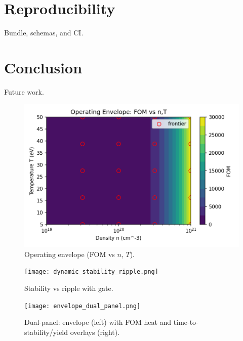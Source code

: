 \documentclass[11pt]{article}
\begin{document}
\section{Reproducibility}
Bundle, schemas, and CI.
\section{Conclusion}
Future work.
\begin{figure}[h]
\centering
\includegraphics[width=0.7\linewidth]{operating_envelope.png}
\caption{Operating envelope (FOM vs $n$, $T$).}\label{fig:envelope}
\end{figure}
\begin{figure}[h]
\centering
\texttt{[image: dynamic\_stability\_ripple.png]}
\caption{Stability vs ripple with gate.}\label{fig:ripple}
\end{figure}
\begin{figure}[h]
\centering
\texttt{[image: envelope\_dual\_panel.png]}
\caption{Dual-panel: envelope (left) with FOM heat and time-to-stability/yield overlays (right).}
\end{figure}
\end{document}
